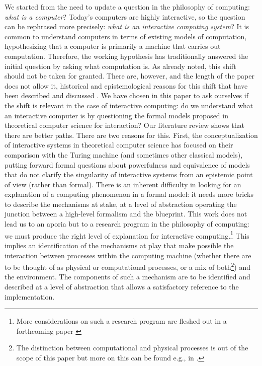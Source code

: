 \documentclass[a4paper, 11pt, twoside]{article}
\begin{document}
We started from the need to update a question in the philosophy of computing: \textit{what is a computer}? Today's computers are highly interactive, so the question can be rephrased more precisely: \textit{what is an interactive computing system}? It is common to understand computers in terms of existing models of computation, hypothesizing that a computer is primarily a machine that carries out computation. Therefore, the working hypothesis has traditionally answered the initial question by asking what computation is. As already noted, this shift should not be taken for granted. There are, however, and the length of the paper does not allow it, historical and epistemological reasons for this shift that have been described and discussed \parencite{Daylight2014, DeMol2018a, Haigh2020}. We have chosen in this paper to ask ourselves if the shift is relevant in the case of interactive computing: do we understand what an interactive computer is by questioning the formal models proposed in theoretical computer science for interaction? Our literature review shows that there are better paths. There are two reasons for this. First, the conceptualization of interactive systems in theoretical computer science has focused on their comparison with the Turing machine (and sometimes other classical models), putting forward formal questions about powerfulness and equivalence of models that do not clarify the singularity of interactive systems from an epistemic point of view (rather than formal). There is an inherent difficulty in looking for an explanation of a computing phenomenon in a formal model: it needs more bricks to describe the mechanisms at stake, at a level of abstraction operating the junction between a high-level formalism and the blueprint. This work does not lead us to an aporia but to a research program in the philosophy of computing: we must produce the right level of explanation for interactive computing.\footnote{More considerations on such a research program are fleshed out in a forthcoming paper \parencite{Martin2023}} This implies an identification of the mechanisms at play that make possible the interaction between processes within the computing machine (whether there are to be thought of as physical or computational processes, or a mix of both\footnote{The distinction between computational and physical processes is out of the scope of this paper but more on this can be found e.g., in \parencite{Kycia_Niemczynowicz_2020}.}) and the environment. The components of such a mechanism are to be identified and described at a level of abstraction that allows a satisfactory reference to the implementation. 

 


%
\printbibliography %
\end{document}
